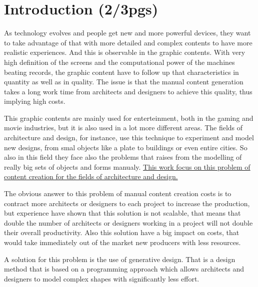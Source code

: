 
% 
% 

\section{Introduction (2/3pgs)}
\label{sec:Introduction}


As technology evolves and people get new and more powerful devices, they want to take advantage of that with more detailed and complex contents to have more realistic experiences.
And this is observable in the graphic contents. With very high definition of the screens and the computational power of the machines beating records, the graphic content have to follow up that characteristics in quantity as well as in quality. The issue is that the manual content generation takes a long work time from architects and designers to achieve this quality, thus implying high costs.

This graphic contents are mainly used for enterteinment, both in the gaming and movie industries, but it is also used in a lot more different areas. The fields of architecture and design, for instance, use this technique to experiment and model new designs, from smal objects like a plate to buildings or even entire cities. So also in this field they face also the problems that raises from the modelling of really big sets of objects and forms manualy. \underline{This work focus on this problem of content creation for the fields of architecture and design.}

The obvious answer to this problem of manual content creation costs is to contract more architects or designers to each project to increase the production, but experience have shown that this solution is not scalable, that means that double the number of architects or designers working in a project will not double their overall productivity. Also this solution have a big impact on costs, that would take immediately out of the market new producers with less resources.

A solution for this problem is the use of generative design. That is a design method that is based on a programming approach which allows architects and designers to model complex shapes with significantly less effort. 


